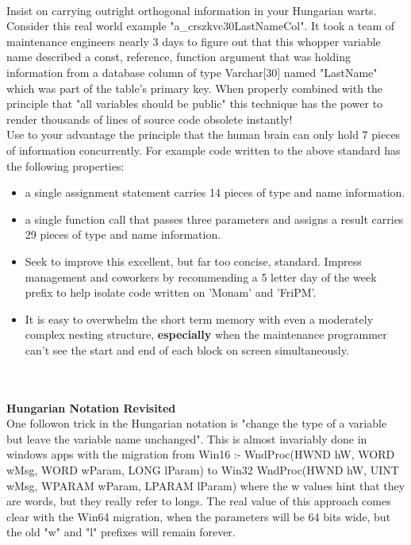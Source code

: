 \documentclass[11pt,twoside,a4paper]{article}
\begin{document}
\begin{minipage}[ht]{0.15\textwidth} ~\\ \end{minipage} \hfill \begin{minipage}[ht]{0.85\textwidth}
	Insist on carrying outright orthogonal information in your Hungarian warts. Consider this real world example "a\_crszkvc30LastNameCol". It took a team of maintenance engineers nearly 3 days to figure out that this whopper variable name described a const, reference, function argument that was holding information from a database column of type Varchar[30] named "LastName" which was part of the table's primary key. When properly combined with the principle that "all variables should be public" this technique has the power to render thousands of lines of source code obsolete instantly!~\\ 
	
	Use to your advantage the principle that the human brain can only hold 7 pieces of information concurrently. For example code written to the above standard has the following properties: 
	\begin{itemize}
		\item a single assignment statement carries 14 pieces of type and name information. 
		\item a single function call that passes three parameters and assigns a result carries 29 pieces of type and name information. 
		\item Seek to improve this excellent, but far too concise, standard. Impress management and coworkers by recommending a 5 letter day of the week prefix to help isolate code written on 'Monam' and 'FriPM'. 
		\item It is easy to overwhelm the short term memory with even a moderately complex nesting structure, \textbf{especially} when the maintenance programmer can't see the start and end of each block on screen simultaneously. 
	\end{itemize}
\end{minipage}~\\~\\

\textbf{Hungarian Notation Revisited}~\\
One followon trick in the Hungarian notation is "change the type of a variable but leave the variable name unchanged". This is almost invariably done in windows apps with the migration from Win16 :- WndProc(HWND hW, WORD wMsg, WORD wParam, LONG lParam) to Win32 WndProc(HWND hW, UINT wMsg, WPARAM wParam, LPARAM lParam) where the w values hint that they are words, but they really refer to longs. The real value of this approach comes clear with the Win64 migration, when the parameters will be 64 bits wide, but the old "w" and "l" prefixes will remain forever.~\\ 
\end{document}

